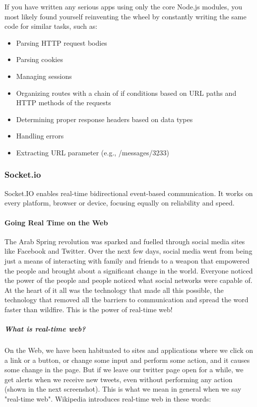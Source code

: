 If you have written any serious apps using only the core Node.js modules, you most likely found yourself reinventing the wheel by constantly writing the same code for similar tasks, such as:
\begin{itemize}
  \item Parsing HTTP request bodies
  \item Parsing cookies
  \item Managing sessions
  \item Organizing routes with a chain of if conditions based on URL paths and HTTP methods of the
requests
  \item Determining proper response headers based on data types
  \item Handling errors
  \item Extracting URL parameter (e.g., /messages/3233)
\end{itemize}
\cite{15}
\subsubsection{Socket.io}
Socket.IO enables real-time bidirectional event-based communication.
It works on every platform, browser or device, focusing equally on reliability and speed.\cite{15}
\paragraph*{Going Real Time on the Web}
\hfill \break
The Arab Spring revolution was sparked and fuelled through social media sites like
Facebook and Twitter. Over the next few days, social media went from being just
a means of interacting with family and friends to a weapon that empowered the
people and brought about a significant change in the world. Everyone noticed the
power of the people and people noticed what social networks were capable of. At
the heart of it all was the technology that made all this possible, the technology that
removed all the barriers to communication and spread the word faster than wildfire.
This is the power of real-time web!\cite{15}

\subparagraph*{What is real-time web?}
\hfill \break
On the Web, we have been habituated to sites and applications where we click on a
link or a button, or change some input and perform some action, and it causes some
change in the page. But if we leave our twitter page open for a while, we get alerts
when we receive new tweets, even without performing any action (shown in the next
screenshot). This is what we mean in general when we say "real-time web".
Wikipedia introduces real-time web in these words:\cite{15}

